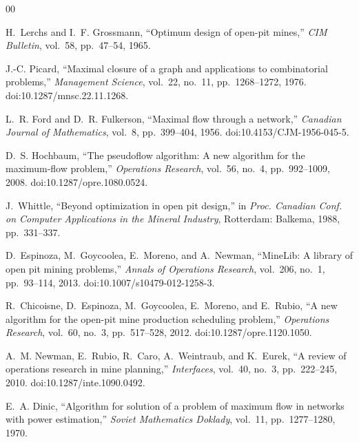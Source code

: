 \documentclass[journal]{IEEEtran}
\begin{document}
\begin{thebibliography}{00}

 H.~Lerchs and I.~F. Grossmann, ``Optimum design of open-pit mines,'' \emph{CIM Bulletin},
vol.~58, pp.~47--54, 1965.

 J.-C. Picard, ``Maximal closure of a graph and applications to combinatorial problems,''
\emph{Management Science}, vol.~22, no.~11, pp.~1268--1272, 1976. doi:10.1287/mnsc.22.11.1268.

 L.~R. Ford and D.~R. Fulkerson, ``Maximal flow through a network,'' \emph{Canadian
Journal of Mathematics}, vol.~8, pp.~399--404, 1956. doi:10.4153/CJM-1956-045-5.

 D.~S. Hochbaum, ``The pseudoflow algorithm: A new algorithm for the maximum-flow problem,''
\emph{Operations Research}, vol.~56, no.~4, pp.~992--1009, 2008. doi:10.1287/opre.1080.0524.

 J.~Whittle, ``Beyond optimization in open pit design,'' in \emph{Proc. Canadian Conf. on
Computer Applications in the Mineral Industry}, Rotterdam: Balkema, 1988, pp.~331--337.

 D.~Espinoza, M.~Goycoolea, E.~Moreno, and A.~Newman, ``MineLib: A library of open pit mining
problems,'' \emph{Annals of Operations Research}, vol.~206, no.~1, pp.~93--114, 2013.
doi:10.1007/s10479-012-1258-3.

 R.~Chicoisne, D.~Espinoza, M.~Goycoolea, E.~Moreno, and E.~Rubio, ``A new algorithm for the
open-pit mine production scheduling problem,'' \emph{Operations Research}, vol.~60, no.~3, pp.~517--528, 2012.
doi:10.1287/opre.1120.1050.

 A.~M. Newman, E.~Rubio, R.~Caro, A.~Weintraub, and K.~Eurek, ``A review of operations research
in mine planning,'' \emph{Interfaces}, vol.~40, no.~3, pp.~222--245, 2010. doi:10.1287/inte.1090.0492.

 E.~A. Dinic, ``Algorithm for solution of a problem of maximum flow in networks with power
estimation,'' \emph{Soviet Mathematics Doklady}, vol.~11, pp.~1277--1280, 1970.

\end{thebibliography}
\end{document}
